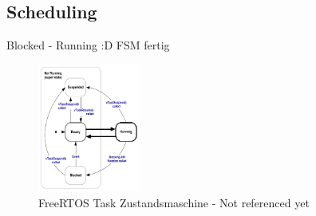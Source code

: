 \subsection{Scheduling}
\label{Scheduling}
Blocked - Running :D FSM fertig
\begin{figure}[ht!]
	\centering
		\includegraphics[width=0.3\textwidth]{Pictures/FreeRTOSOrg/taskStates.png}
	\caption{FreeRTOS Task Zustandsmaschine  - Not referenced yet}
	\label{fig:SystemviewTarget}
\end{figure}